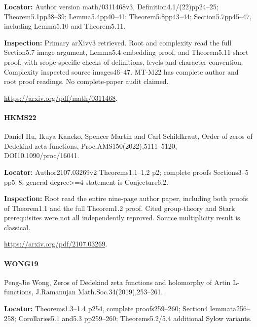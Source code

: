 \documentclass[11pt,a4paper]{article}
\begin{document}
\textbf{Locator:} Author version math/\allowbreak{}0311468v3, Definition4.\allowbreak{}1/\allowbreak{}(22)pp24–\allowbreak{}25; Theorem5.\allowbreak{}1pp38–\allowbreak{}39; Lemma5.\allowbreak{}4pp40–\allowbreak{}41; Theorem5.\allowbreak{}8pp43–\allowbreak{}44; Section5.\allowbreak{}7pp45–\allowbreak{}47, including Lemma5.\allowbreak{}10 and Theorem5.\allowbreak{}11.

\textbf{Inspection:} Primary arXivv3 retrieved.\allowbreak{} Root and complexity read the full Section5.\allowbreak{}7 image argument, Lemma5.\allowbreak{}4 embedding proof, and Theorem5.\allowbreak{}11 short proof, with scope-specific checks of definitions, levels and character convention.\allowbreak{} Complexity inspected source images46–\allowbreak{}47.\allowbreak{} MT-M22 has complete author and root proof readings.\allowbreak{} No complete-paper audit claimed.\allowbreak{}

\url{https://arxiv.org/pdf/math/0311468}.

\paragraph{HKMS22} Daniel Hu, Ikuya Kaneko, Spencer Martin and Carl Schildkraut, Order of zeros of Dedekind zeta functions, Proc.\allowbreak{}AMS150(2022),5111–\allowbreak{}5120, DOI10.\allowbreak{}1090/\allowbreak{}proc/\allowbreak{}16041.

\textbf{Locator:} Author2107.\allowbreak{}03269v2 Theorems1.\allowbreak{}1–\allowbreak{}1.\allowbreak{}2 p2; complete proofs Sections3–\allowbreak{}5 pp5–\allowbreak{}8; general degree>=4 statement is Conjecture6.\allowbreak{}2.

\textbf{Inspection:} Root read the entire nine-page author paper, including both proofs of Theorem1.\allowbreak{}1 and the full Theorem1.\allowbreak{}2 proof.\allowbreak{} Cited group-theory and Stark prerequisites were not all independently reproved.\allowbreak{} Source multiplicity result is classical.\allowbreak{}

\url{https://arxiv.org/pdf/2107.03269}.

\paragraph{WONG19} Peng-Jie Wong, Zeros of Dedekind zeta functions and holomorphy of Artin L-functions, J.\allowbreak{}Ramanujan Math.\allowbreak{}Soc.\allowbreak{}34(2019),253–\allowbreak{}261.

\textbf{Locator:} Theorems1.\allowbreak{}3–\allowbreak{}1.\allowbreak{}4 p254, complete proofs259–\allowbreak{}260; Section4 lemmata256–\allowbreak{}258; Corollaries5.\allowbreak{}1 and5.\allowbreak{}3 pp259–\allowbreak{}260; Theorems5.\allowbreak{}2/\allowbreak{}5.\allowbreak{}4 additional Sylow variants.
\end{document}
